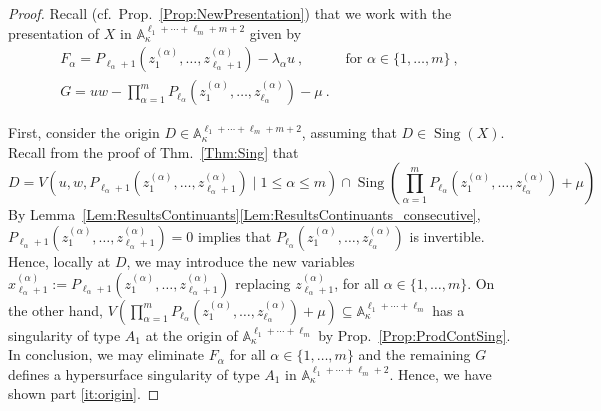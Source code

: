 \documentclass[letter,11pt]{amsart}
\renewcommand{\AA}{\ensuremath{\mathbb{A}}}
\DeclareMathOperator{\Sing}{Sing}
\newcommand{\XX}{X}
\theoremstyle{theorem}
\theoremstyle{definition}
\newcommand{\len}{\ell}
\numberwithin{equation}{section}
\begin{document}
\begin{proof}
	Recall (cf.~Prop.~\ref{Prop:NewPresentation}) 
	that we work with the presentation of $ \XX $ in $ \AA_\kappa^{\len_1+\cdots+\len_m+ m + 2} $ given by 
	\[
	\begin{array}{ll}
		F_\alpha  = P_{\len_\alpha +1} ( z_1^{(\alpha)}, \ldots, z_{\len_\alpha + 1}^{(\alpha)} ) 
		- \lambda_\alpha u
		\ ,
		&
		\mbox{ for } \alpha \in \{ 1, \ldots, m \} 
		\ ,
		\\[3pt]
		
		G = \displaystyle 
		u w - 
		\prod_{\alpha=1}^m P_{\len_\alpha} (z_1^{(\alpha)}, \ldots, z_{\len_\alpha}^{(\alpha)}) - \mu
		\ .  
	\end{array} 
	\]
	 
	First, consider the origin $ D \in \AA_\kappa^{\len_1 + \cdots + \len_m + m + 2} $, 
	assuming that $ D \in \Sing (\XX) $. 
	Recall from the proof of Thm.~\ref{Thm:Sing} that
	\[
			D = 
		V(u,w, P_{\len_\alpha +1} ( z_1^{(\alpha)}, \ldots, z_{\len_\alpha + 1}^{(\alpha)} ) 
		\mid 1 \leq \alpha \leq m )
		\cap 
		\Sing (\prod_{\alpha=1}^m P_{\len_\alpha} ( z_1^{(\alpha)}, \ldots, z_{\len_\alpha}^{(\alpha)} ) + \mu)
	\]
	By Lemma~\ref{Lem:ResultsContinuants}\eqref{Lem:ResultsContinuants_consecutive}, $ P_{\len_\alpha +1} ( z_1^{(\alpha)}, \ldots, z_{\len_\alpha + 1}^{(\alpha)}) = 0 $ implies that 
	$ P_{\len_\alpha } ( z_1^{(\alpha)}, \ldots, z_{\len_\alpha}^{(\alpha)} ) $ is invertible.
	Hence, locally at $ D $, we may introduce the new variables 
	$ x_{\len_\alpha + 1}^{(\alpha)} :=  P_{\len_\alpha +1} ( z_1^{(\alpha)}, \ldots, z_{\len_\alpha + 1}^{(\alpha)} ) $ replacing $ z_{\len_\alpha + 1}^{(\alpha)} $,
	for all $ \alpha \in \{ 1, \ldots, m \} $. 
	On the other hand, 
	$ V ( \prod_{\alpha=1}^m P_{\len_\alpha} ( z_1^{(\alpha)}, \ldots, z_{\len_\alpha}^{(\alpha)} ) + \mu ) \subseteq  \AA_\kappa^{\len_1+\cdots + \len_m} $ has a singularity of type $ A_1 $ at the origin of $ \AA_\kappa^{\len_1+\cdots + \len_m} $ by Prop.~\ref{Prop:ProdContSing}.
	\\
	In conclusion, we may eliminate $ F_\alpha $ for all $ \alpha \in \{ 1, \ldots, m \} $ and the remaining $ G $ defines a hypersurface singularity of type $ A_1 $ in $ \AA_\kappa^{\len_1+\cdots+\len_m+2} $. 
	Hence, we have shown part \eqref{it:origin}.
	

\end{proof}
\end{document}

